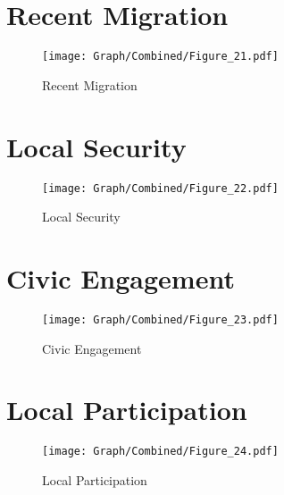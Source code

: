 \documentclass[10pt,a4paper]{article}
\begin{document}
\section{Recent Migration}
\begin{table}[H]\centering

\end{table}
\begin{figure}[H]\centering
\texttt{[image: Graph/Combined/Figure\_21.pdf]}
\caption{Recent Migration} \label{fig:Fig_21}
\end{figure}
\begin{table}[H]\centering

\end{table}
\section{Local Security}
\begin{table}[H]\centering

\end{table}
\begin{figure}[H]\centering
\texttt{[image: Graph/Combined/Figure\_22.pdf]}
\caption{Local Security} \label{fig:Fig_22}
\end{figure}
\begin{table}[H]\centering

\end{table}
\section{Civic Engagement}
\begin{table}[H]\centering

\end{table}
\begin{figure}[H]\centering
\texttt{[image: Graph/Combined/Figure\_23.pdf]}
\caption{Civic Engagement} \label{fig:Fig_23}
\end{figure}
\begin{table}[H]\centering

\end{table}
\section{Local Participation}
\begin{table}[H]\centering

\end{table}
\begin{figure}[H]\centering
\texttt{[image: Graph/Combined/Figure\_24.pdf]}
\caption{Local Participation} \label{fig:Fig_24}
\end{figure}
\begin{table}[H]\centering

\end{table}
\end{document}
